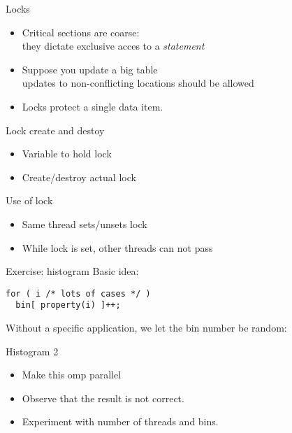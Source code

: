 \begin{numberedframe}{Locks}
  \begin{itemize}
  \item Critical sections are coarse:\\
    they dictate exclusive acces to a \emph{statement}
  \item     Suppose you update a big table\\
    updates to non-conflicting locations should be allowed
  \item Locks protect a single data item.
  \end{itemize}
\end{numberedframe}

\begin{numberedframe}{Lock create and destoy}
  \begin{itemize}
  \item Variable to hold lock
  \item Create/destroy actual lock
  \end{itemize}
\end{numberedframe}

\begin{numberedframe}{Use of lock}
  \begin{itemize}
  \item Same thread sets/unsets lock
  \item While lock is set, other threads can not pass
  \end{itemize}
\end{numberedframe}

\begin{numberedframe}{Exercise: histogram}
  Basic idea:
\begin{lstlisting}
for ( i /* lots of cases */ )
  bin[ property(i) ]++;
\end{lstlisting}
Without a specific application, we let the bin number
be random:
\end{numberedframe}

\begin{numberedframe}{Histogram 2}
  \begin{itemize}
  \item Make this omp parallel
  \item Observe that the result is not correct.
  \item   Experiment with number of threads and bins.
  \end{itemize}
\end{numberedframe}

